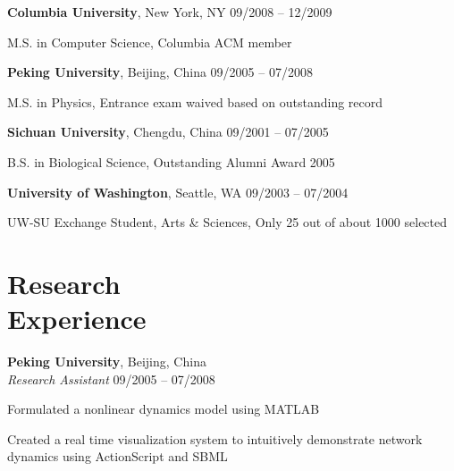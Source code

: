 \documentclass[margin,line]{resume}
\begin{document}
\begin{resume}
    \textbf{Columbia University}, New York, NY \hfill 09/2008 -- 12/2009 \vspace{-3mm}\\\vspace{-1mm}%
      \begin{list2}
       \item M.S. in Computer Science, Columbia ACM member
      \end{list2}
 

    \textbf{Peking University}, Beijing, China \hfill 09/2005 -- 07/2008 \vspace{-3mm}\\\vspace{-1mm}%
      \begin{list2}
       \item M.S. in Physics, Entrance exam waived based on outstanding record
      \end{list2}
    
    \textbf{Sichuan University}, Chengdu, China \hfill 09/2001 -- 07/2005 \vspace{-3mm}\\\vspace{-1mm}%
      \begin{list2}
       \item B.S. in Biological Science, Outstanding Alumni Award 2005
      \end{list2}

    \textbf{University of Washington}, Seattle, WA \hfill 09/2003 -- 07/2004 \vspace{-3mm}\\\vspace{-1mm}%
      \begin{list2}
       \item  UW-SU Exchange Student, Arts \& Sciences, Only 25 out of about 1000 selected
      \end{list2}

    \section{\mysidestyle Research \\ Experience}

    \textbf{Peking University}, Beijing, China \\
    \textsl{Research Assistant} \hfill 09/2005 -- 07/2008 \vspace{-3mm}\\\vspace{-1mm}%
      \begin{list2}
      \item Formulated a nonlinear dynamics model using MATLAB
      \item Created a real time visualization system to intuitively demonstrate network dynamics using ActionScript and SBML 
      \end{list2}


\end{resume}
\end{document}

